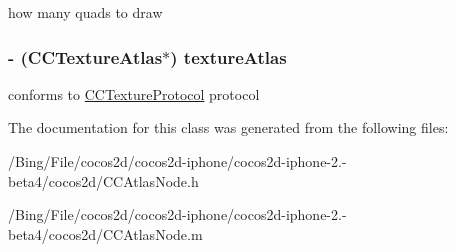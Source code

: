how many quads to draw \hypertarget{interface_c_c_atlas_node_ad1cf740dfe711b0875533aef41afd507}{
\subsubsection[{texture\-Atlas}]{\setlength{\rightskip}{0pt plus 5cm}-\/ ({\bf C\-C\-Texture\-Atlas}$\ast$) {\bf texture\-Atlas}}}\label{interface_c_c_atlas_node_ad1cf740dfe711b0875533aef41afd507}
conforms to \hyperlink{protocol_c_c_texture_protocol-p}{C\-C\-Texture\-Protocol} protocol 

The documentation for this class was generated from the following files\-:\begin{DoxyCompactItemize}
\item 
/\-Bing/\-File/cocos2d/cocos2d-\/iphone/cocos2d-\/iphone-\/2.-\/beta4/cocos2d/C\-C\-Atlas\-Node.\-h\item 
/\-Bing/\-File/cocos2d/cocos2d-\/iphone/cocos2d-\/iphone-\/2.-\/beta4/cocos2d/C\-C\-Atlas\-Node.\-m\end{DoxyCompactItemize}
